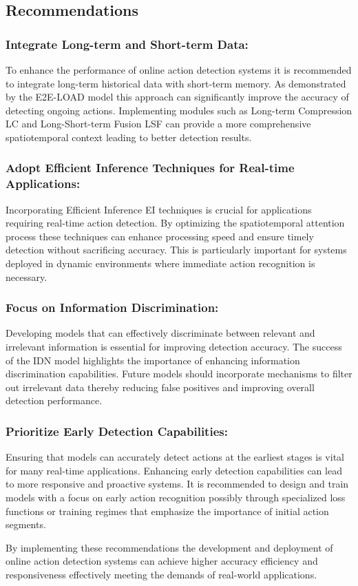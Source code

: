 { 
\subsection{Recommendations}

\subsubsection{ Integrate Long-term and Short-term Data:
}
 To enhance the performance of online action detection systems it is recommended to integrate long-term historical data with short-term memory. As demonstrated by the E2E-LOAD model this approach can significantly improve the accuracy of detecting ongoing actions. Implementing modules such as Long-term Compression LC and Long-Short-term Fusion LSF can provide a more comprehensive spatiotemporal context leading to better detection results.

\subsubsection{ Adopt Efficient Inference Techniques for Real-time Applications:
}
   Incorporating Efficient Inference EI techniques is crucial for applications requiring real-time action detection. By optimizing the spatiotemporal attention process these techniques can enhance processing speed and ensure timely detection without sacrificing accuracy. This is particularly important for systems deployed in dynamic environments where immediate action recognition is necessary.

\subsubsection{ Focus on Information Discrimination:
}
   Developing models that can effectively discriminate between relevant and irrelevant information is essential for improving detection accuracy. The success of the IDN model highlights the importance of enhancing information discrimination capabilities. Future models should incorporate mechanisms to filter out irrelevant data thereby reducing false positives and improving overall detection performance.

\subsubsection{Prioritize Early Detection Capabilities:
}
   Ensuring that models can accurately detect actions at the earliest stages is vital for many real-time applications. Enhancing early detection capabilities can lead to more responsive and proactive systems. It is recommended to design and train models with a focus on early action recognition possibly through specialized loss functions or training regimes that emphasize the importance of initial action segments.

By implementing these recommendations the development and deployment of online action detection systems can achieve higher accuracy efficiency and responsiveness effectively meeting the demands of real-world applications.

}



